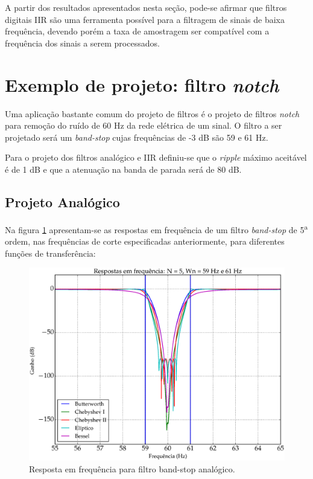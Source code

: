A partir dos resultados apresentados nesta seção, pode-se afirmar que filtros digitais IIR são uma ferramenta possível para a filtragem de sinais de baixa frequência, devendo porém a taxa de amostragem ser compatível com a frequência dos sinais a serem processados.

\section{Exemplo de projeto: filtro \textit{notch}}
\label{sec:notch}
Uma aplicação bastante comum do projeto de filtros é o projeto de filtros \textit{notch} para remoção do ruído de 60 Hz da rede elétrica de um sinal. O filtro a ser projetado será um \textit{band-stop} cujas frequências de -3 dB são 59 e 61 Hz. 

Para o projeto dos filtros analógico e IIR definiu-se que o \textit{ripple} máximo aceitável é de 1 dB e que a atenuação na banda de parada será de 80 dB.

\subsection{Projeto Analógico}
Na figura \ref{fig:bandstop_analog_response} apresentam-se as respostas em frequência de um filtro \textit{band-stop} de 5\textsuperscript{a} ordem, nas frequências de corte especificadas anteriormente, para diferentes funções de transferência:

\begin{figure}[H]
  \centering
  \includegraphics[scale=0.48]{images/plots/bandstop_analog}
  \caption{Resposta em frequência para filtro band-stop analógico.}
  \label{fig:bandstop_analog_response}
\end{figure}

